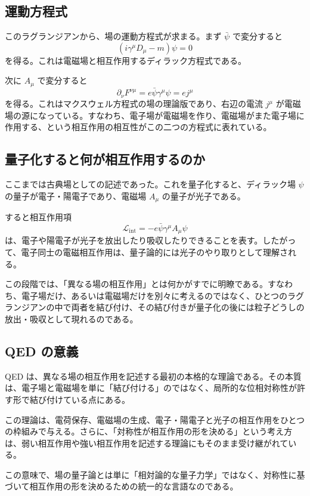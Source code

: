 \subsection{運動方程式}
このラグランジアンから、場の運動方程式が求まる。まず $\bar{\psi}$ で変分すると
\[
\left(i\gamma^\mu D_\mu - m\right)\psi = 0
\]
を得る。これは電磁場と相互作用するディラック方程式である。

次に $A_\mu$ で変分すると
\[
\partial_\nu F^{\nu\mu} = e\bar{\psi}\gamma^\mu\psi = e j^\mu
\]
を得る。これはマクスウェル方程式の場の理論版であり、右辺の電流 $j^\mu$ が電磁場の源になっている。すなわち、電子場が電磁場を作り、電磁場がまた電子場に作用する、という相互作用の相互性がこの二つの方程式に表れている。

\subsection{量子化すると何が相互作用するのか}
ここまでは古典場としての記述であった。これを量子化すると、ディラック場 $\psi$ の量子が電子・陽電子であり、電磁場 $A_\mu$ の量子が光子である。

すると相互作用項
\[
\mathcal{L}_{\mathrm{int}} = - e\bar{\psi}\gamma^\mu A_\mu \psi
\]
は、電子や陽電子が光子を放出したり吸収したりできることを表す。したがって、電子同士の電磁相互作用は、量子論的には光子のやり取りとして理解される。

この段階では、「異なる場の相互作用」とは何かがすでに明瞭である。すなわち、電子場だけ、あるいは電磁場だけを別々に考えるのではなく、ひとつのラグランジアンの中で両者を結び付け、その結び付きが量子化の後には粒子どうしの放出・吸収として現れるのである。

\subsection{QED の意義}
QED は、異なる場の相互作用を記述する最初の本格的な理論である。その本質は、電子場と電磁場を単に「結び付ける」のではなく、局所的な位相対称性が許す形で結び付けている点にある。

この理論は、電荷保存、電磁場の生成、電子・陽電子と光子の相互作用をひとつの枠組みで与える。さらに、「対称性が相互作用の形を決める」という考え方は、弱い相互作用や強い相互作用を記述する理論にもそのまま受け継がれている。

この意味で、場の量子論とは単に「相対論的な量子力学」ではなく、対称性に基づいて相互作用の形を決めるための統一的な言語なのである。
